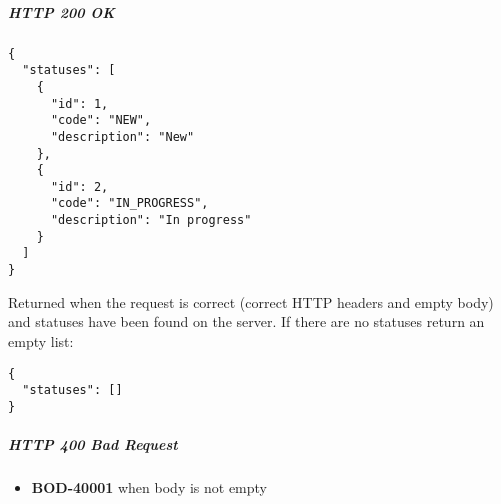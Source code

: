 \documentclass[a4paper]{article}
\begin{document}
    \subparagraph{HTTP 200 OK}
    \begin{verbatim}
{
  "statuses": [
    {
      "id": 1,
      "code": "NEW",
      "description": "New"
    },
    {
      "id": 2,
      "code": "IN_PROGRESS",
      "description": "In progress"
    }
  ]
}
    \end{verbatim}
    Returned when the request is correct (correct HTTP headers and empty body) and statuses have been found on the server. If there are no statuses return an empty list:
    \begin{verbatim}
{
  "statuses": []
}
    \end{verbatim}

    \subparagraph{HTTP 400 Bad Request}
    \begin{itemize}
        \item \textbf{BOD-40001} when body is not empty
    \end{itemize}
\end{document}
